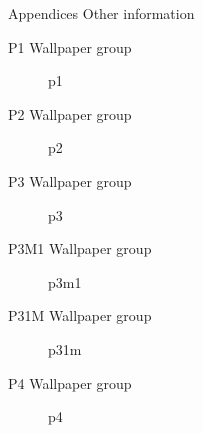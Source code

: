 \documentclass{beamer}
\theoremstyle{definition}
\begin{document}

\begin{frame}{Appendices}
    Other information
\end{frame}

\begin{frame}{P1 Wallpaper group}
    \begin{figure}
        \centering
        
        \caption{p1}
        \label{fig:p1}
    \end{figure}
\end{frame}

\begin{frame}{P2 Wallpaper group}
    \begin{figure}
        \centering
        
        \caption{p2}
        \label{fig:p2}
    \end{figure}
\end{frame}

\begin{frame}{P3 Wallpaper group}
    \begin{figure}
        \centering
        
        \caption{p3}
        \label{fig:p3}
    \end{figure}
\end{frame}

\begin{frame}{P3M1 Wallpaper group}
    \begin{figure}
        \centering
        
        \caption{p3m1}
        \label{fig:p3m1}
    \end{figure}
\end{frame}

\begin{frame}{P31M Wallpaper group}
    \begin{figure}
        \centering
        
        \caption{p31m}
        \label{fig:p31m}
    \end{figure}
\end{frame}

\begin{frame}{P4 Wallpaper group}
    \begin{figure}
        \centering
        
        \caption{p4}
        \label{fig:p4}
    \end{figure}
\end{frame}
\end{document}
